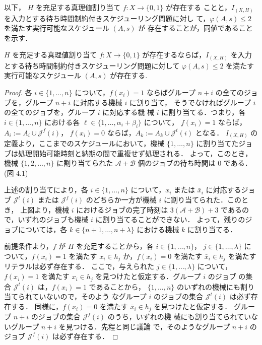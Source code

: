 \documentclass[12pt]{optlab-bachelor}
\begin{document}
以下， $H$ を充足する真理値割り当て $f : X \to \{0,1\}$ が存在する
ことと，$I_{(X,H)}$ を入力とする待ち時間制約付きスケジューリング問題に対し
て，$\varphi(A,s) \le 2$ を満たす実行可能なスケジュール $(A,s)$ が
存在することが，同値であることを示す．

\begin{lemma}\label{l_6}
  $H$ を充足する真理値割り当て $f : X \to \{0,1\}$ が存在するならば，$I_{(X,H)}$ を入力とする待ち時間制約付きスケジューリング問題に対して $\varphi(A,s) \le 2$ を満たす実行可能なスケジュール $(A,s)$ が存在する.
\end{lemma}

\begin{proof}
  各 $i \in \{1,\ldots, n\}$ について，$f(x_i) = 1$ ならばグループ $n +
  i$ の全てのジョブを，グループ $n + i$ に対応する機械 $i$ に割り当て，
  そうでなければグループ $i$ の全てのジョブを，グループ $i$ に対応する機
  械 $i$ に割り当てる．つまり，各 $i \in \{1,\ldots, n\}$ における各
  $\ell \in \{1,\ldots,\alpha_i + \beta_i\}$ について，
  $f(x_i) = 1$ ならば，$A_i := A_i \cup \mathcal{J}^f(i)$，
  $f(x_i) = 0$ ならば，$A_k := A_k \cup \mathcal{J}^t(i)$ となる．
  $I_{(X,H)}$ の定義より，ここまでのスケジュールにおいて，機械
  $\{1,\ldots, n\}$ に割り当てたジョブは処理開始可能時刻と納期の間で重複せず処理される．
  よって，このとき，機械 $\{1,2,\ldots,n\}$ に割り当てられた
  $\mathcal{A} + \mathcal{B}$ 個のジョブの待ち時間は $0$ である．(図 $4.1$)

  上述の割り当てにより，各 $i \in \{1,\ldots,n\}$ について，$x_i$ または
  $\bar x_i$ に対応するジョブ $\mathcal{J}^t(i)$ または
  $\mathcal{J}^f(i)$ のどちらか一方が機械 $i$ に割り当てられた．このとき，
  上図より，機械 $i$ におけるジョブの完了時刻は $3(\mathcal{A} +
  \mathcal{B}) + 3$ であるので，いずれのジョブも機械 $i$ に割り当てることができない．
  よって，残りのジョブについては，各 $k \in \{n + 1,\ldots,n +
  \lambda\}$ における機械 $k$ に割り当てる．

  前提条件より，$f$ が $H$ を充足することから，各 $i \in \{1,\ldots,n\}$，
  $j \in \{1, \ldots, \lambda \}$ について，$f(x_i) = 1$ を満たす $x_i
  \in h_j$ か，$f(x_i) = 0$ を満たす $\bar x_i \in h_j$ を満たすリテラルは必ず存在する．
  ここで，与えられた $j \in \{1, \ldots, \lambda \}$ について，$f(x_i) =
  1$ を満たす $x_i \in h_j$ を見つけたと仮定する．グループ $i$ のジョブ
  の集合 $\mathcal{J}^t(i)$ は，$f(x_i) = 1$ であることから，
  $\{1,\ldots,n\}$ のいずれの機械にも割り当てられていないので，そのよう
  なグループ $i$ のジョブの集合 $\mathcal{J}^t(i)$ は必ず存在する．
  同様に，$f(x_i) = 0$ を満たす $\bar x_i \in h_j$ を見つけたと仮定する．
  グループ $n + i$ のジョブの集合 $\mathcal{J}^f(i)$ のうち，いずれの機
  械にも割り当てられていないグループ $n + i$ を見つける．先程と同じ議論
  で，そのようなグループ $n + i$ のジョブ $\mathcal{J}^f(i)$ は必ず存在する．


\end{proof}
\end{document}
